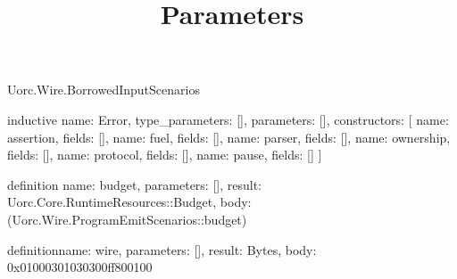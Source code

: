 \begin{lexlean}{Uorc.Wire.BorrowedInputScenarios}
\title{Parameters}
\begin{semanticmodule}
inductive{
  name: Error,
  type_parameters: [],
  parameters: [],
  constructors: [
    {name: assertion, fields: []},
    {name: fuel, fields: []},
    {name: parser, fields: []},
    {name: ownership, fields: []},
    {name: protocol, fields: []},
    {name: pause, fields: []}
  ]
}

definition{
  name: budget,
  parameters: [],
  result: Uorc.Core.RuntimeResources::Budget,
  body: (Uorc.Wire.ProgramEmitScenarios::budget)
}

definition{name: wire, parameters: [], result: Bytes, body: 0x01000301030300ff800100}


\end{semanticmodule}
\end{lexlean}
